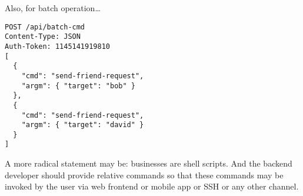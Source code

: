\begin{multicols*}{2}
    Also, for batch operation\ldots

\begin{lstlisting}
POST /api/batch-cmd
Content-Type: JSON
Auth-Token: 1145141919810
[
  {
    "cmd": "send-friend-request",
    "argm": { "target": "bob" }
  },
  {
    "cmd": "send-friend-request",
    "argm": { "target": "david" }
  }
]
\end{lstlisting}

A more radical statement may be: businesses are shell scripts.
And the backend developer should provide relative commands
so that these commands may be invoked by the user
via web frontend or mobile app or SSH or any other channel.

\end{multicols*}

